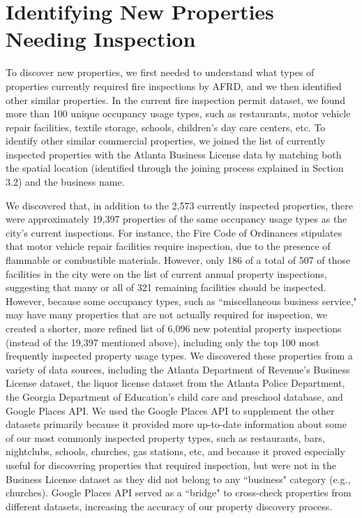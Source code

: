\documentclass{sig-alternate-05-2015}
\begin{document}
{\section{Identifying New Properties \\Needing Inspection}
To discover new properties, we first needed to understand what types of properties currently required fire inspections by AFRD, and we then identified other similar properties. In the current fire inspection permit dataset, we found more than 100 unique occupancy usage types, such as restaurants, motor vehicle repair facilities, textile storage, schools, children's day care centers, etc. To identify other similar commercial properties, we joined the list of currently inspected properties with the Atlanta Business License data by matching both the spatial location (identified through the joining process explained in Section 3.2) and the business name. 

We discovered that, in addition to the 2,573 currently inspected properties, there were approximately 19,397 properties of the same occupancy usage types as the city's current inspections. For instance, the Fire Code of Ordinances stipulates that motor vehicle repair facilities require inspection, due to the presence of flammable or combustible materials. However, only 186 of a total of 507 of those facilities in the city were on the list of current annual property inspections, suggesting that many or all of 321 remaining facilities should be inspected. However, because some occupancy types, such as ``miscellaneous business service," may have many properties that are not actually required for inspection, we created a shorter, more refined list of 6,096 new potential property inspections (instead of the 19,397 mentioned above), including only the top 100 most frequently inspected property usage types. 
We discovered these properties from a variety of data sources, including the Atlanta Department of Revenue's Business License dataset, the liquor license dataset from the Atlanta Police Department, the Georgia Department of Education's child care and preschool database, and Google Places API. 
We used the Google Places API to supplement the other datasets primarily because it provided more up-to-date information about some of our most commonly inspected property types, such as restaurants, bars, nightclubs, schools, churches, gas stations, etc, and because it proved especially useful for discovering properties that required inspection, but were not in the Business License dataset as they did not belong to any ``business" category (e.g., churches). 
Google Places API served as a ``bridge" to cross-check properties from different datasets, increasing the accuracy of our property discovery process.

}
\end{document}
